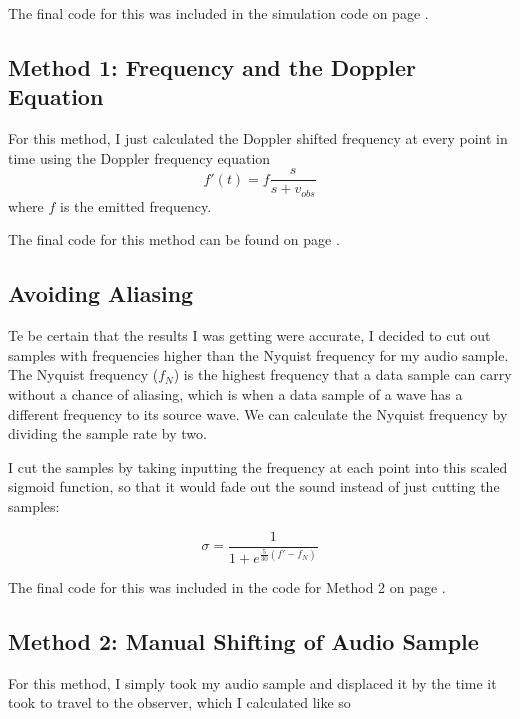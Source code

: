 \documentclass[%
 reprint,
 amsmath,amssymb,
 aps,
]{revtex4-1}
\begin{document}
The final code for this was included in the simulation code on page \pageref{sec:codetimearr}.

\subsection{\label{sec:method1}Method 1: Frequency and the Doppler Equation}

For this method, I just calculated the Doppler shifted frequency at every point in time using the Doppler frequency equation
\begin{equation}\label{eq:doppler}
f'(t) = f \dfrac{s}{s+v_{obs}}
\end{equation}
where $f$ is the emitted frequency.

The final code for this method can be found on page \pageref{sec:codemethod1}.

\subsection{\label{sec:aliasing}Avoiding Aliasing}

Te be certain that the results I was getting were accurate, I decided to cut out samples with frequencies higher than the Nyquist frequency for my audio sample. The Nyquist frequency ($f_N$) is the highest frequency that a data sample can carry without a chance of aliasing, which is when a data sample of a wave has a different frequency to its source wave. We can calculate the Nyquist frequency by dividing the sample rate by two. 

I cut the samples by taking inputting the frequency at each point into this scaled sigmoid function, so that it would fade out the sound instead of just cutting the samples:

\begin{equation}\label{eq:sigma}
\sigma = \dfrac{1}{1+e^{ \frac{5}{30}(f'-f_N)}}
\end{equation}

The final code for this was included in the code for Method 2 on page \pageref{sec:codemethod1}.

\subsection{\label{sec:method2}Method 2: Manual Shifting of Audio Sample}

For this method, I simply took my audio sample and displaced it by the time it took to travel to the observer, which I calculated like so
\end{document}
